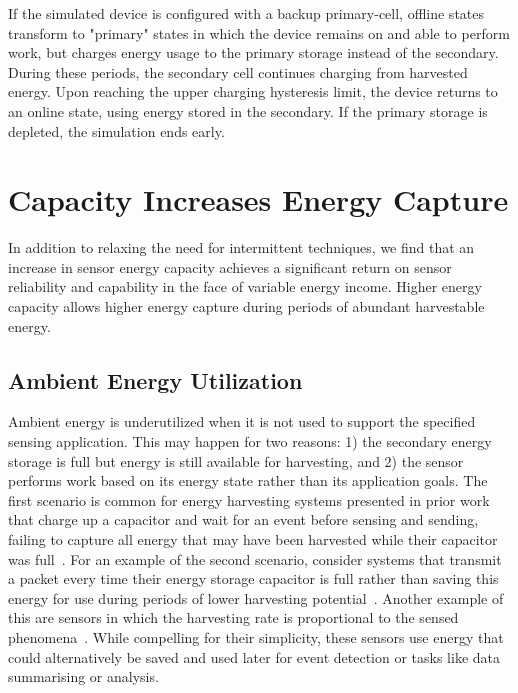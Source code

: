 If the simulated device is configured with a backup primary-cell, offline
states transform to "primary" states in which the device remains on and
able to perform work, but charges energy usage to the primary storage instead
of the secondary. During these periods, the secondary cell continues charging
from harvested energy. Upon reaching the upper charging hysteresis
limit, the device returns to an online state, using energy stored in the
secondary.  If the primary storage is depleted, the simulation ends early.


\section{Capacity Increases Energy Capture}
\label{sec:capacity:capture}

In addition to relaxing the need for intermittent techniques, we find that
an increase in sensor energy capacity
achieves a significant return on sensor
reliability and capability in the face of variable energy income.  Higher
energy capacity allows higher energy capture during periods of abundant
harvestable energy.

\subsection{Ambient Energy Utilization}
\label{sec:capacity:utilization}

Ambient energy is underutilized when it is not used to support the specified
sensing application. This may happen for two reasons: 1) 
the secondary
energy storage is full but energy is still available for harvesting, and 2) the
sensor performs work based on its energy state rather than its application
goals. The first scenario is common for energy harvesting systems
presented in prior work that charge up a capacitor and wait for an event
before sensing and sending, failing to capture all energy that may
have been harvested while their capacitor was full~\cite{campbellEnergy14, afanasov2020battery}.
For an example of the second scenario, consider
systems that transmit a packet every time their energy storage capacitor
is full rather than saving this energy for use during periods of lower harvesting
potential~\cite{hesterFlicker17, colinReconfigurable18}. Another example of this are sensors in which the harvesting
rate is proportional to the sensed phenomena~\cite{debruin2013monjolo}.
While compelling for their simplicity, these sensors use
energy that could alternatively be saved and used
later for event detection or tasks like data summarising or analysis.

